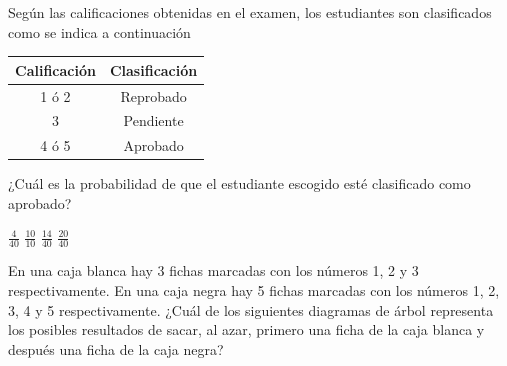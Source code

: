 \documentclass[10pt,letterpaper,addpoints]{exam}
\begin{document}
\begin{multicols}{2}
\begin{questions}
\question \label{quest02} Según las calificaciones obtenidas en el examen, los estudiantes son clasificados como se indica a continuación
\begin{center}
\begin{tabular}{|c|c|}
\hline 
\textbf{Calificación} & Clasificación \\ 
\hline 
1 ó 2 & Reprobado \\ 
\hline 
3 & Pendiente \\ 
\hline 
4 ó 5 & Aprobado \\ 
\hline 
\end{tabular} 
\end{center}
¿Cuál es la probabilidad de que el estudiante escogido esté clasificado como aprobado?

\begin{oneparchoices}
\choice $\frac{4}{40}$ \choice $\frac{10}{10}$
\CorrectChoice $\frac{14}{40}$ \choice $\frac{20}{40}$
\end{oneparchoices}
\question En una caja blanca hay 3 fichas marcadas con los números 1, 2 y 3 respectivamente. En una caja negra hay 5 fichas marcadas con los números 1, 2, 3, 4 y 5 respectivamente. ¿Cuál de los siguientes diagramas de árbol representa los posibles resultados de sacar, al
azar, primero una ficha de la caja blanca y después una ficha de la caja negra?



\end{questions}
\end{multicols}
\end{document}
